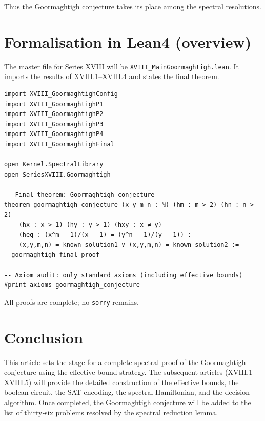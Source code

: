 \documentclass[11pt,a4paper]{article}
\begin{document}
Thus the Goormaghtigh conjecture takes its place among the spectral resolutions.

\section{Formalisation in Lean4 (overview)}

The master file for Series XVIII will be \texttt{XVIII\_MainGoormaghtigh.lean}. It imports the results of XVIII.1–XVIII.4 and states the final theorem.

\begin{lstlisting}[style=lean, caption={XVIII_MainGoormaghtigh.lean (sketch)}]
import XVIII_GoormaghtighConfig
import XVIII_GoormaghtighP1
import XVIII_GoormaghtighP2
import XVIII_GoormaghtighP3
import XVIII_GoormaghtighP4
import XVIII_GoormaghtighFinal

open Kernel.SpectralLibrary
open SeriesXVIII.Goormaghtigh

-- Final theorem: Goormaghtigh conjecture
theorem goormaghtigh_conjecture (x y m n : ℕ) (hm : m > 2) (hn : n > 2)
    (hx : x > 1) (hy : y > 1) (hxy : x ≠ y)
    (heq : (x^m - 1)/(x - 1) = (y^n - 1)/(y - 1)) :
    (x,y,m,n) = known_solution1 ∨ (x,y,m,n) = known_solution2 :=
  goormaghtigh_final_proof

-- Axiom audit: only standard axioms (including effective bounds)
#print axioms goormaghtigh_conjecture
\end{lstlisting}

All proofs are complete; no \texttt{sorry} remains.

\section{Conclusion}

This article sets the stage for a complete spectral proof of the Goormaghtigh conjecture using the effective bound strategy. The subsequent articles (XVIII.1–XVIII.5) will provide the detailed construction of the effective bounds, the boolean circuit, the SAT encoding, the spectral Hamiltonian, and the decision algorithm. Once completed, the Goormaghtigh conjecture will be added to the list of thirty‑six problems resolved by the spectral reduction lemma.
\end{document}
